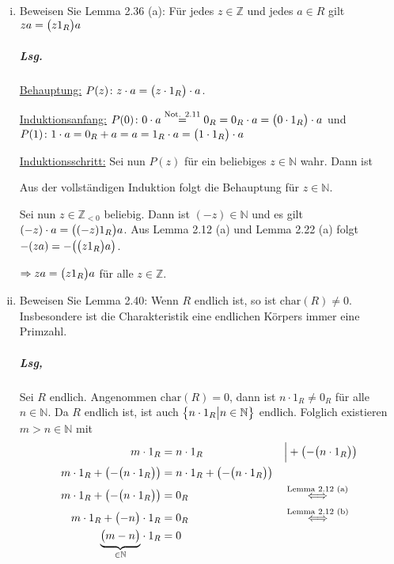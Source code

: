 \documentclass{scrreprt}
\newcommand\Char{\text{char}}
\begin{document}
\begin{enumerate}[(i)]
\item Beweisen Sie Lemma 2.36 (a): Für jedes $z \in \mathbb{Z}$ und jedes
  $a \in R$ gilt $za = \qty\big(z1_R)a$

  \subparagraph{Lsg.} \underline{Behauptung:}
  $P(z) \colon z \cdot a = \qty\big(z \cdot 1_R) \cdot a$.

  \underline{Induktionsanfang:}
  $P(0) \colon 0 \cdot a \overset{\text{Not. 2.11}}= 0_R =
  0_R \cdot a = \qty\big(0 \cdot 1_R) \cdot a$ und \\
  $P(1) \colon 1 \cdot a = 0_R + a = a = 1_R \cdot a =
  \qty\big(1 \cdot 1_R) \cdot a$

  \underline{Induktionsschritt:} Sei nun $P(z)$ für ein beliebiges
  $z \in \mathbb{N}$ wahr.
  Dann ist
  Aus der vollständigen Induktion folgt die Behauptung für $z \in \mathbb{N}$.

  Sei nun $z \in \mathbb{Z}_{< 0}$ beliebig.
  Dann ist $(-z) \in \mathbb{N}$ und es gilt $(-z) \cdot a = \qty\big((-z)1_R)a$.
  Aus Lemma 2.12 (a)  und Lemma 2.22 (a) folgt $-(za) = -\qty(\qty\big(z1_R) a)$.

  $\Rightarrow za = \qty\big(z1_R)a$ für alle $z \in \mathbb{Z}$.

\item Beweisen Sie Lemma 2.40: Wenn $R$ endlich ist, so ist $\Char(R) \ne 0$.
  Insbesondere ist die Charakteristik eine endlichen Körpers immer eine
  Primzahl.

  \subparagraph{Lsg,} Sei $R$ endlich.
  Angenommen $\Char(R) = 0$, dann ist $n \cdot 1_R \ne 0_R$ für alle
  $n \in \mathbb{N}$.
  Da $R$ endlich ist, ist auch $\qty\big{n \cdot 1_R {\big |} n \in \mathbb{N}}$
  endlich.
  Folglich existieren $m > n \in \mathbb{N}$ mit
  \begin{align*}
    m \cdot 1_R &= n \cdot 1_R && {\Big |} + \qty(-\qty\big(n \cdot 1_R)) \\
    m \cdot 1_R + \qty(-\qty\big(n \cdot 1_R)) &= n \cdot 1_R + \qty(-\qty\big(n \cdot 1_R)) \\
    m \cdot 1_R + \qty(-\qty\big(n \cdot 1_R)) &= 0_R && \overset{\text{Lemma 2.12 (a)}}\iff \\
    m \cdot 1_R + \qty\big(- n) \cdot 1_R &= 0_R && \overset{\text{Lemma 2.12 (b)}}\iff \\
    \underset{\in \mathbb{N}}{\underbrace{\qty\big(m - n)}} \cdot 1_R &= 0
  \end{align*}


\end{enumerate}
\end{document}
